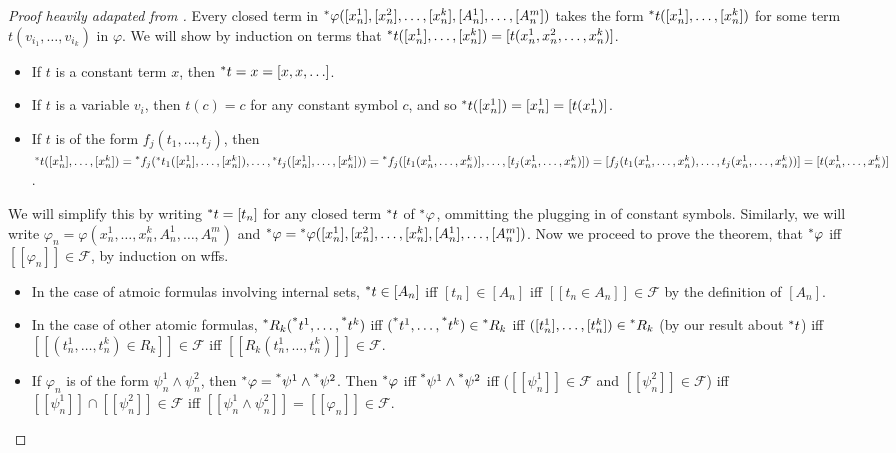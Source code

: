 \begin{proof}[Proof heavily adapated from ]
    Every closed term in $\prescript{*}{}{\varphi}([x^1_n], [x^2_n], \ldots, [x^k_n], [A^1_n], \ldots, [A^m_n])$ takes the form $\prescript{*}{}{t}([x^1_n], \ldots, [x^k_n])$ for some term $t(v_{i_1}, \ldots, v_{i_k})$ in $\varphi$. We will show by induction on terms that $\prescript{*}{}{t}([x^1_n], \ldots, [x^k_n]) = [t(x^1_n, x^2_n, \ldots, x^k_n)]$.
    \begin{itemize}
        \item If $t$ is a constant term $x$, then $\prescript{*}{}{t} = x = [x, x, \ldots]$.
        \item If $t$ is a variable $v_i$, then $t(c) = c$ for any constant symbol $c$, and so $\prescript{*}{}{t}([x^1_n]) = [x^1_n] = [t(x^1_n)]$.
        \item If $t$ is of the form $f_j(t_1, \ldots, t_j)$, then $\prescript{*}{}{t}([x^1_n], \ldots, [x^k_n]) = \prescript{*}{}{f_j}(\prescript{*}{}{t_1}([x^1_n], \ldots, [x^k_n]), \ldots, \prescript{*}{}{t_j}([x^1_n], \ldots, [x^k_n])) = \prescript{*}{}{f_j}([t_1(x^1_n, \ldots, x^k_n)], \ldots, [t_j(x^1_n, \ldots, x^k_n)]) = [f_j(t_1(x^1_n, \ldots, x^k_n), \ldots, t_j(x^1_n, \ldots, x^k_n))] = [t(x^1_n, \ldots, x^k_n)]$.
    \end{itemize}
    We will simplify this by writing $\prescript{*}{}{t} = [t_n]$ for any closed term $\prescript{*}{}{t}$ of $\prescript{*}{}{\varphi}$, ommitting the plugging in of constant symbols. Similarly, we will write $\varphi_n = \varphi(x^1_n, \ldots, x^k_n, A^1_n, \ldots, A^m_n)$ and $\prescript{*}{}{\varphi} =  \prescript{*}{}{\varphi}([x^1_n], [x^2_n], \ldots, [x^k_n], [A^1_n], \ldots, [A^m_n])$. Now we proceed to prove the theorem, that $\prescript{*}{}{\varphi}$ iff $[[\varphi_n]] \in \mathcal{F}$, by induction on wffs. 
    \begin{itemize}
        \item In the case of atmoic formulas involving internal sets, $\prescript{*}{}{t} \in [A_n]$ iff $[t_n] \in [A_n]$ iff $[[t_n \in A_n]] \in \mathcal{F}$ by the definition of $[A_n]$.

        \item In the case of other atomic formulas, $\prescript{*}{}{R_k}(\prescript{*}{}{t^1}, \ldots, \prescript{*}{}{t^k})$ iff $(\prescript{*}{}{t^1}, \ldots, \prescript{*}{}{t^k}) \in \prescript{*}{}{R_k}$ iff $([t^1_n], \ldots, [t^k_n]) \in \prescript{*}{}{R_k}$ (by our result about $\prescript{*}{}{t}$) iff $[[(t^1_n, \ldots, t^k_n) \in R_k]] \in \mathcal{F}$ iff $[[R_k(t^1_n, \ldots, t^k_n)]] \in \mathcal{F}$.
        
        \item If $\varphi_n$ is of the form $\psi^1_n \land \psi^2_n$, then $\prescript{*}{}{\varphi} = \prescript{*}{}{\psi^1} \land \prescript{*}{}{\psi^2}$. Then $\prescript{*}{}{\varphi}$ iff $\prescript{*}{}{\psi^1} \land \prescript{*}{}{\psi^2}$ iff ($[[\psi^1_n]] \in \mathcal {F}$ and $[[\psi^2_n]] \in \mathcal{F}$) iff $[[\psi^1_n]] \cap [[\psi^2_n]] \in \mathcal{F}$ iff $[[\psi^1_n \land \psi^2_n]] = [[\varphi_n]] \in \mathcal{F}$.
        

\end{itemize}
\end{proof}
